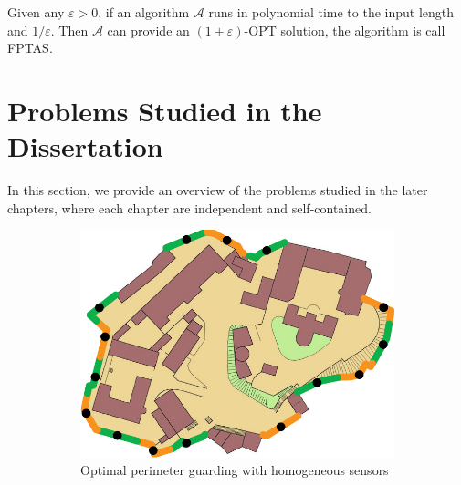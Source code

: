 \begin{definition}
    Given any $\varepsilon>0$, if an algorithm $\mathcal A$ runs in polynomial time to the input length and $1/\varepsilon$. 
    Then $\mathcal A$ can provide an $(1+\varepsilon)$-OPT solution, the algorithm is call FPTAS.
\end{definition}
\section{Problems Studied in the Dissertation}
In this section, we provide an overview of the problems studied in the later chapters, 
where each chapter are independent and self-contained. 

\begin{figure}[h]
    \centering
    \begin{subfigure}[b]{0.4\textwidth}
        \centering
        \includegraphics[width = \textwidth]{chapters/opg/figures/castle_15-eps-converted-to.pdf}
        \caption{Optimal perimeter guarding with homogeneous sensors}
        \label{fig:intro-opg-ho}
    \end{subfigure}
    \begin{subfigure}[b]{0.4\textwidth}
        \centering

\end{subfigure}
\end{figure}
